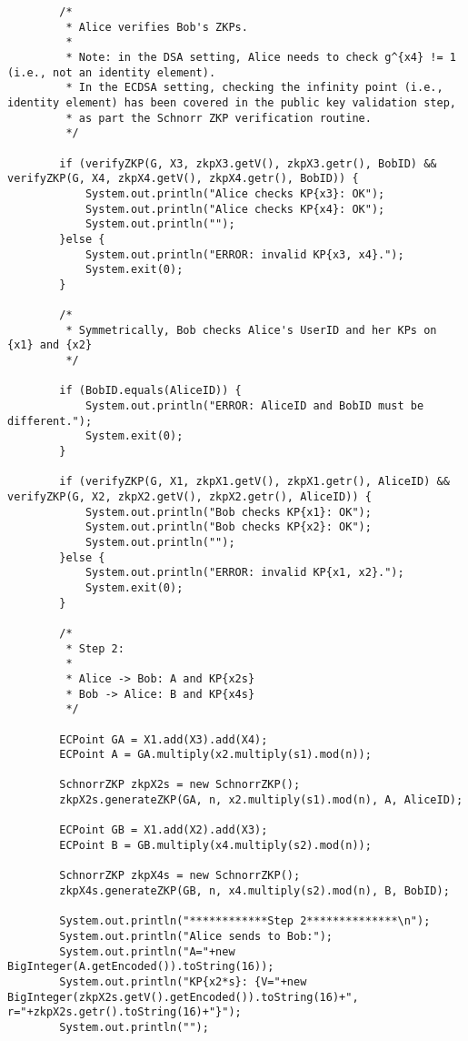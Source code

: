 \documentclass[../PFC.tex]{subfiles}
\begin{document}
\begin{lstlisting}
    	/* 
    	 * Alice verifies Bob's ZKPs.
    	 * 
    	 * Note: in the DSA setting, Alice needs to check g^{x4} != 1 (i.e., not an identity element). 
    	 * In the ECDSA setting, checking the infinity point (i.e., identity element) has been covered in the public key validation step, 
    	 * as part the Schnorr ZKP verification routine.
    	 */
    	
    	if (verifyZKP(G, X3, zkpX3.getV(), zkpX3.getr(), BobID) && verifyZKP(G, X4, zkpX4.getV(), zkpX4.getr(), BobID)) {
    		System.out.println("Alice checks KP{x3}: OK");
    		System.out.println("Alice checks KP{x4}: OK");
    		System.out.println("");
    	}else {
    		System.out.println("ERROR: invalid KP{x3, x4}.");
    		System.exit(0);
    	}
		
    	/*
    	 * Symmetrically, Bob checks Alice's UserID and her KPs on {x1} and {x2}
    	 */
    	
    	if (BobID.equals(AliceID)) {
    		System.out.println("ERROR: AliceID and BobID must be different.");
    		System.exit(0);
    	}
    	    	
    	if (verifyZKP(G, X1, zkpX1.getV(), zkpX1.getr(), AliceID) && verifyZKP(G, X2, zkpX2.getV(), zkpX2.getr(), AliceID)) {
    		System.out.println("Bob checks KP{x1}: OK");
    		System.out.println("Bob checks KP{x2}: OK");
    		System.out.println("");
    	}else {
    		System.out.println("ERROR: invalid KP{x1, x2}.");
    		System.exit(0);
    	}
    	
    	/*
    	 * Step 2:
    	 * 
    	 * Alice -> Bob: A and KP{x2s}
    	 * Bob -> Alice: B and KP{x4s}
    	 */

    	ECPoint GA = X1.add(X3).add(X4); 
    	ECPoint A = GA.multiply(x2.multiply(s1).mod(n));
				
    	SchnorrZKP zkpX2s = new SchnorrZKP();
    	zkpX2s.generateZKP(GA, n, x2.multiply(s1).mod(n), A, AliceID);
		
    	ECPoint GB = X1.add(X2).add(X3); 
    	ECPoint B = GB.multiply(x4.multiply(s2).mod(n));
				
    	SchnorrZKP zkpX4s = new SchnorrZKP();
    	zkpX4s.generateZKP(GB, n, x4.multiply(s2).mod(n), B, BobID);
    	
    	System.out.println("************Step 2**************\n");
    	System.out.println("Alice sends to Bob:");
    	System.out.println("A="+new BigInteger(A.getEncoded()).toString(16));
    	System.out.println("KP{x2*s}: {V="+new BigInteger(zkpX2s.getV().getEncoded()).toString(16)+", r="+zkpX2s.getr().toString(16)+"}");
    	System.out.println("");


\end{lstlisting}
\end{document}
